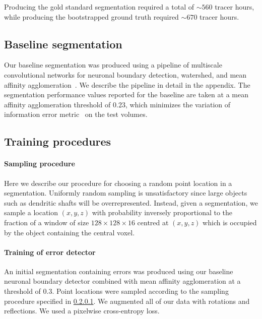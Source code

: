 \documentclass{article}
\begin{document}
Producing the gold standard segmentation required a total of $\sim 560$ tracer hours, while producing the bootstrapped ground truth required $\sim 670$ tracer hours.

\subsection{Baseline segmentation}
Our baseline segmentation was produced using a pipeline of multiscale convolutional networks for neuronal boundary detection, watershed, and mean affinity agglomeration~\cite{kisuk}. We describe the pipeline in detail in the appendix. The segmentation performance values reported for the baseline are taken at a mean affinity agglomeration threshold of 0.23, which minimizes the variation of information error metric~\cite{meila2007,vi} on the test volumes.

\subsection{Training procedures}
\paragraph{Sampling procedure}
\label{sec:sampling}
Here we describe our procedure for choosing a random point location in a segmentation. Uniformly random sampling is unsatisfactory since large objects such as dendritic shafts will be overrepresented. Instead, given a segmentation, we sample a location $(x,y,z)$ with probability inversely proportional to the fraction of a window of size $128 \times 128 \times 16$ centred at $(x,y,z)$ which is occupied by the object containing the central voxel.

\paragraph{Training of error detector}
An initial segmentation containing errors was produced using our baseline neuronal boundary detector combined with mean affinity agglomeration at a threshold of 0.3. Point locations were sampled according to the sampling procedure specified in \ref{sec:sampling}. We augmented all of our data with rotations and reflections. We used a pixelwise cross-entropy loss.
\end{document}
